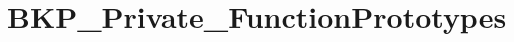 \hypertarget{group___b_k_p___private___function_prototypes}{\section{B\-K\-P\-\_\-\-Private\-\_\-\-Function\-Prototypes}
\label{group___b_k_p___private___function_prototypes}
}
